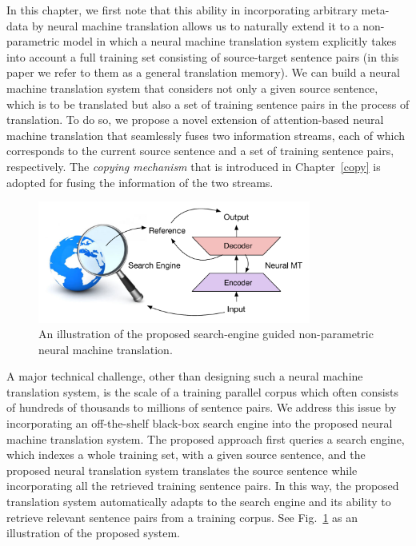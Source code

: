 In this chapter, we first note that this ability in incorporating arbitrary meta-data by neural machine translation allows us to naturally extend it to a non-parametric
model in which a neural machine translation system explicitly takes into account a full training set consisting of source-target sentence pairs (in this paper we refer to them as a general translation memory). We can build a neural machine translation system that considers not only a given source sentence, which is to be translated but also a set of training sentence pairs in the process of translation. To do so, we propose a novel extension of attention-based neural machine translation that seamlessly fuses two information streams, each of which corresponds to the current source sentence and a set of training sentence pairs, respectively. The \textit{copying mechanism} that is introduced in Chapter~\ref{copy} is adopted for fusing the information of the two streams.  
\begin{figure}[t]
	\centering
	\includegraphics[width=0.8\textwidth]{figs/seg/picture}
	\caption{\label{cp4.fig.illustration}An illustration of the proposed search-engine guided non-parametric neural machine  translation.}
\end{figure}

A major technical challenge, other than designing such a neural machine translation system, is the scale of a training parallel corpus which often consists of hundreds of thousands to millions of sentence pairs. We address this issue by incorporating an off-the-shelf black-box search engine into the proposed neural machine translation system. The proposed approach first queries a search engine, which indexes a whole training set, with a given source sentence, and the proposed neural translation system translates the source sentence while incorporating all the retrieved training sentence pairs. In this way, the proposed translation system automatically adapts to the search engine and its ability to retrieve relevant sentence pairs from a training corpus. See Fig.~\ref{cp4.fig.illustration} as an illustration of the proposed system.

